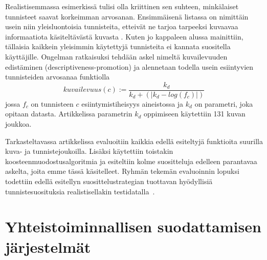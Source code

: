 \documentclass[12pt,finnish]{tktltiki2}
\theoremstyle{definition}
\theoremstyle{remark}
\begin{document}
Realistisemmassa esimerkissä tulisi olla kriittinen sen suhteen, minkälaiset tunnisteet saavat korkeimman arvosanan. Ensimmäisenä listassa on nimittäin usein niin yleisluontoisia tunnisteita, etteivät ne tarjoa tarpeeksi kuvaavaa informaatiota käsiteltävästä kuvasta \cite{Sigurbjornsson:2008:FTR:1367497.1367542}. Kuten jo kappaleen alussa mainittiin, tällaisia kaikkein yleisimmin käytettyjä tunnisteita ei kannata suositella käyttäjille. Ongelman ratkaisuksi tehdään askel nimeltä kuvailevuuden edistäminen (descriptiveness-promotion) ja alennetaan todella usein esiintyvien tunnisteiden arvosanaa funktiolla
\begin{displaymath}
kuvailevuus(c) := \frac{k_d}{k_d + (|k_d -log(f_c)|)}
\end{displaymath}
jossa $f_c$ on tunnisteen $c$ esiintymistiheisyys aineistossa ja $k_d$ on parametri, joka opitaan datasta. Artikkelissa parametrin $k_d$ oppimiseen käytettiin 131 kuvan joukkoa.

Tarkasteltavassa artikkelissa evaluoitiin kaikkia edellä esiteltyjä funktioita suurilla kuva- ja tunnistejoukoilla. Lisäksi käytettiin toistakin koosteenmuodostusalgoritmia ja esiteltiin kolme suositteluja edelleen parantavaa askelta, joita emme tässä käsitelleet. Ryhmän tekemän evaluoinnin lopuksi todettiin edellä esitellyn suosittelustrategian tuottavan hyödyllisiä tunnistesuosituksia realistisellakin testidatalla~\cite{Sigurbjornsson:2008:FTR:1367497.1367542}.



\section{Yhteistoiminnallisen suodattamisen järjestelmät}
\end{document}
